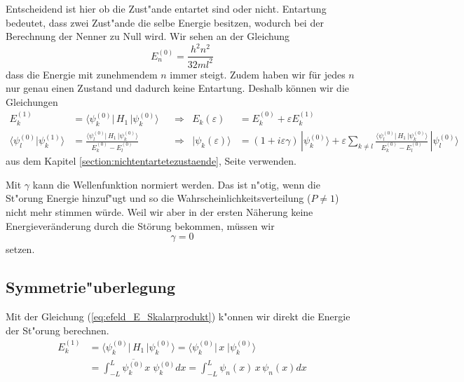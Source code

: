 \begin{refsection}
Entscheidend ist hier ob die Zust"ande entartet sind oder nicht.
Entartung bedeutet, dass zwei Zust"ande die selbe Energie besitzen, 
wodurch bei der Berechnung der Nenner zu Null wird.
Wir sehen an der Gleichung
\[
  E_n^{(0)} = \frac{h^2n^2}{32ml^2}
\]
dass die Energie mit zunehmendem $n$ immer steigt. 
Zudem haben wir f\"ur jedes $n$ nur genau einen Zustand und dadurch keine Entartung. 
Deshalb k\"onnen wir die Gleichungen
\begin{equation}
\begin{aligned}
\label{eq:efeld_E_Skalarprodukt}
E_k^{(1)} &=
\langle \psi_k^{(0)}|\, H_1 \,|\psi_k^{(0)}\rangle
&&\Longrightarrow
& E_k(\varepsilon)&=E_k^{(0)} + \varepsilon E_k^{(1)}
\\
\langle\psi_l^{(0)}|\psi_k^{(1)}\rangle
&=
\frac{\langle \psi_l^{(0)}|\, H_1 \,|\psi_k^{(0)}\rangle}{E_k^{(0)}-E_l^{(0)}}
&&\Longrightarrow
& |\psi_k(\varepsilon)\rangle &=
(1+i\varepsilon \gamma)
\,|\psi_k^{(0)}\rangle
+
\varepsilon
\sum_{k\ne l}
\frac{\langle \psi_l^{(0)}|\, H_1 \,|\psi_k^{(0)}\rangle}{E_k^{(0)}-E_l^{(0)}}
\,
|\psi_l^{(0)}\rangle
\end{aligned}
\end{equation}
aus dem Kapitel \ref{section:nichtentartetezustaende}, Seite \pageref{section:nichtentartetezustaende} verwenden.

Mit $\gamma$ kann die Wellenfunktion normiert werden.
Das ist n"otig, wenn die St"orung Energie hinzuf"ugt
und so die Wahrscheinlichkeitsverteilung ($P \ne 1$) nicht mehr stimmen w\"urde.
Weil wir aber in der ersten N\"aherung keine 
Energiever\"anderung durch die St\"orung bekommen, m\"ussen wir
\begin{equation}
  \label{eq:efeld_gamma}
  \gamma = 0
\end{equation}
setzen.




\subsection{Symmetrie"uberlegung}
Mit der Gleichung (\ref{eq:efeld_E_Skalarprodukt}) k"onnen wir direkt die Energie der St"orung berechnen.
\begin{equation}
\begin{aligned}
  E_{k}^{(1)} 
 &= \langle \psi_k^{(0)}|\, H_1 \,|\psi_k^{(0)}\rangle 
  = \langle \psi_k^{(0)}|\, x \;|\psi_k^{(0)}\rangle                   \\
 &= \int_{-L}^{L} \overline{\psi_k^{(0)}} x \; \psi_k^{(0)} dx
  = \int_{-L}^{L} \psi_n(x) \, x \, \psi_n(x) dx
\end{aligned}
\end{equation}


\end{refsection}

